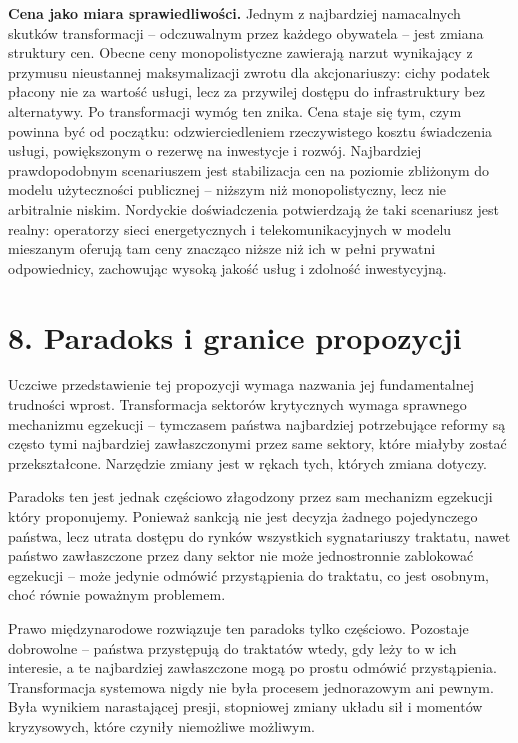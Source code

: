 \documentclass[12pt,a4paper]{article}
\begin{document}
\textbf{Cena jako miara sprawiedliwości.} Jednym z najbardziej namacalnych
skutków transformacji -- odczuwalnym przez każdego obywatela -- jest zmiana
struktury cen. Obecne ceny monopolistyczne zawierają narzut wynikający z
przymusu nieustannej maksymalizacji zwrotu dla akcjonariuszy: cichy podatek
płacony nie za wartość usługi, lecz za przywilej dostępu do infrastruktury
bez alternatywy. Po transformacji wymóg ten znika. Cena staje się tym, czym
powinna być od początku: odzwierciedleniem rzeczywistego kosztu świadczenia
usługi, powiększonym o rezerwę na inwestycje i rozwój. Najbardziej
prawdopodobnym scenariuszem jest stabilizacja cen na poziomie zbliżonym
do modelu użyteczności publicznej -- niższym niż monopolistyczny, lecz nie
arbitralnie niskim. Nordyckie doświadczenia potwierdzają że taki scenariusz
jest realny: operatorzy sieci energetycznych i telekomunikacyjnych w modelu
mieszanym oferują tam ceny znacząco niższe niż ich w pełni prywatni
odpowiednicy, zachowując wysoką jakość usług i zdolność inwestycyjną.

\section*{8. Paradoks i granice propozycji}

Uczciwe przedstawienie tej propozycji wymaga nazwania jej fundamentalnej
trudności wprost. Transformacja sektorów krytycznych wymaga sprawnego
mechanizmu egzekucji -- tymczasem państwa najbardziej potrzebujące reformy
są często tymi najbardziej zawłaszczonymi przez same sektory, które miałyby
zostać przekształcone. Narzędzie zmiany jest w rękach tych, których zmiana
dotyczy.

Paradoks ten jest jednak częściowo złagodzony przez sam mechanizm egzekucji
który proponujemy. Ponieważ sankcją nie jest decyzja żadnego pojedynczego
państwa, lecz utrata dostępu do rynków wszystkich sygnatariuszy traktatu,
nawet państwo zawłaszczone przez dany sektor nie może jednostronnie
zablokować egzekucji -- może jedynie odmówić przystąpienia do traktatu,
co jest osobnym, choć równie poważnym problemem.

Prawo międzynarodowe rozwiązuje ten paradoks tylko częściowo. Pozostaje
dobrowolne -- państwa przystępują do traktatów wtedy, gdy leży to w ich
interesie, a te najbardziej zawłaszczone mogą po prostu odmówić przystąpienia.
Transformacja systemowa nigdy nie była procesem jednorazowym ani pewnym.
Była wynikiem narastającej presji, stopniowej zmiany układu sił i momentów
kryzysowych, które czyniły niemożliwe możliwym.
\end{document}
